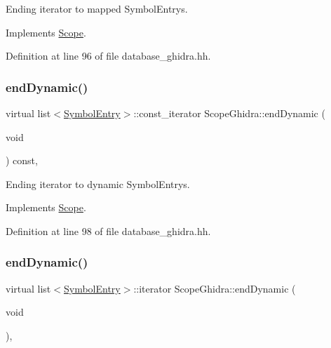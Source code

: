 Ending iterator to mapped Symbol\+Entrys. 



Implements \mbox{\hyperlink{class_scope_a186b8c11ebef0f2d3838bfe1e46b6db6}{Scope}}.



Definition at line 96 of file database\+\_\+ghidra.\+hh.

\mbox{\label{class_scope_ghidra_abbb53b6abc143a87ab2ad12337d9d571}} 
\subsubsection{\texorpdfstring{endDynamic()}{endDynamic()}\hspace{0.1cm}{\footnotesize\ttfamily [1/2]}}
{\footnotesize\ttfamily virtual list$<$\mbox{\hyperlink{class_symbol_entry}{Symbol\+Entry}}$>$\+::const\+\_\+iterator Scope\+Ghidra\+::end\+Dynamic (\begin{DoxyParamCaption}\item[{void}]{ }\end{DoxyParamCaption}) const\hspace{0.3cm}{\ttfamily [inline]}, {\ttfamily [virtual]}}



Ending iterator to dynamic Symbol\+Entrys. 



Implements \mbox{\hyperlink{class_scope_add98c4a0c13d3497f82d0a5c2353b578}{Scope}}.



Definition at line 98 of file database\+\_\+ghidra.\+hh.

\mbox{\label{class_scope_ghidra_abeb947fec06dcffbf611e30686a37657}} 
\subsubsection{\texorpdfstring{endDynamic()}{endDynamic()}\hspace{0.1cm}{\footnotesize\ttfamily [2/2]}}
{\footnotesize\ttfamily virtual list$<$\mbox{\hyperlink{class_symbol_entry}{Symbol\+Entry}}$>$\+::iterator Scope\+Ghidra\+::end\+Dynamic (\begin{DoxyParamCaption}\item[{void}]{ }\end{DoxyParamCaption})\hspace{0.3cm}{\ttfamily [inline]}, {\ttfamily [virtual]}}



